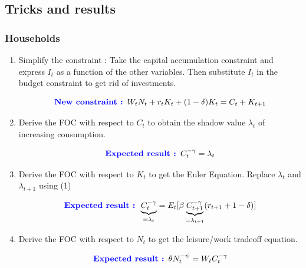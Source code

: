 \documentclass{article}
\begin{document}
\subsection{Tricks and results}

\subsubsection{Households}
\begin{enumerate}
    \item Simplify the constraint : Take the capital accumulation constraint and express $I_t$ as a function of the other variables. Then substitute $I_t$ in the budget constraint to get rid of investments. 
    \begin{expectedresultsbox}
    \begin{equation}
        \textcolor{blue}{\textbf{New constraint : }} W_tN_t + r_tK_t + (1-\delta)K_t = C_t + K_{t+1}
    \end{equation}
    \end{expectedresultsbox}
    \item Derive the FOC with respect to $C_t$ to obtain the shadow value $\lambda_t$ of increasing consumption.
    \begin{expectedresultsbox}
    \begin{equation}
        \textcolor{blue}{\textbf{Expected result : }} C_t^{-\gamma} = \lambda_t
    \end{equation}
    \end{expectedresultsbox}
    \item Derive the FOC with respect to $K_t$ to get the Euler Equation. Replace $\lambda_{t}$ and $\lambda{_{t+1}}$ using (1)
    \begin{expectedresultsbox}
    \begin{equation}
        \textcolor{blue}{\textbf{Expected result : }} \underbrace{C_t^{-\gamma}}_{=\lambda_t} = E_t[\beta \underbrace{C_{t+1}^{-\gamma}}_{=\lambda_{t+1}}(r_{t+1}+1-\delta)]
    \end{equation}
    \end{expectedresultsbox}
    \item Derive the FOC with respect to $N_t$ to get the leisure/work tradeoff equation.
    \begin{expectedresultsbox}
    \begin{equation}
        \textcolor{blue}{\textbf{Expected result : }} \theta N_t^{-\psi} = W_tC_t^{-\gamma}
    \end{equation}
    \end{expectedresultsbox}
\end{enumerate}
\end{document}
